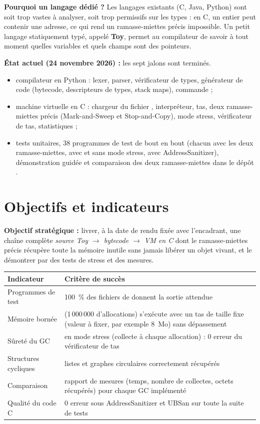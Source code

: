 \documentclass[11pt,a4paper]{article}
\newcommand{\code}[1]{\texttt{\detokenize{#1}}}
\begin{document}
\textbf{Pourquoi un langage dédié ?} Les langages existants (C, Java, Python) sont soit trop vastes à analyser, soit trop permissifs sur les types : en C, un entier peut contenir une adresse, ce qui rend un ramasse-miettes précis impossible. Un petit langage statiquement typé, appelé \textbf{Toy}, permet au compilateur de savoir à tout moment quelles variables et quels champs sont des pointeurs.

\textbf{État actuel (24 novembre 2026) :} les sept jalons sont terminés.
\begin{itemize}
  \item compilateur en Python : lexer, parser, vérificateur de types, générateur de code (bytecode, descripteurs de types, stack maps), commande \code{toyc.py} ;
  \item machine virtuelle en C : chargeur du fichier \code{.tbc}, interpréteur, tas, deux ramasse-miettes précis (Mark-and-Sweep et Stop-and-Copy), mode stress, vérificateur de tas, statistiques ;
  \item tests unitaires, 38 programmes de test de bout en bout (chacun avec les deux ramasse-miettes, avec et sans mode stress, avec AddressSanitizer), démonstration guidée et comparaison des deux ramasse-miettes dans le dépôt \code{bizkda/VMPGC}.
\end{itemize}

\section{Objectifs et indicateurs}

\textbf{Objectif stratégique :} livrer, à la date de rendu fixée avec l'encadrant, une chaîne complète \emph{source Toy $\rightarrow$ bytecode $\rightarrow$ VM en C} dont le ramasse-miettes précis récupère toute la mémoire inutile sans jamais libérer un objet vivant, et le démontrer par des tests de stress et des mesures.

\begin{longtable}{@{}p{} p{}@{}}
\toprule
\textbf{Indicateur} & \textbf{Critère de succès} \\
\midrule
\endhead
Programmes de test & 100~\% des fichiers \code{.toy} de \code{tests/} donnent la sortie attendue \\
Mémoire bornée & \code{list.toy} (1\,000\,000 d'allocations) s'exécute avec un tas de taille fixe (valeur à fixer, par exemple 8~Mo) sans dépassement \\
Sûreté du GC & en mode stress (collecte à chaque allocation) : 0 erreur du vérificateur de tas \\
Structures cycliques & listes et graphes circulaires correctement récupérés \\
Comparaison & rapport de mesures (temps, nombre de collectes, octets récupérés) pour chaque GC implémenté \\
Qualité du code C & 0 erreur sous AddressSanitizer et UBSan sur toute la suite de tests \\
\bottomrule
\end{longtable}
\end{document}
